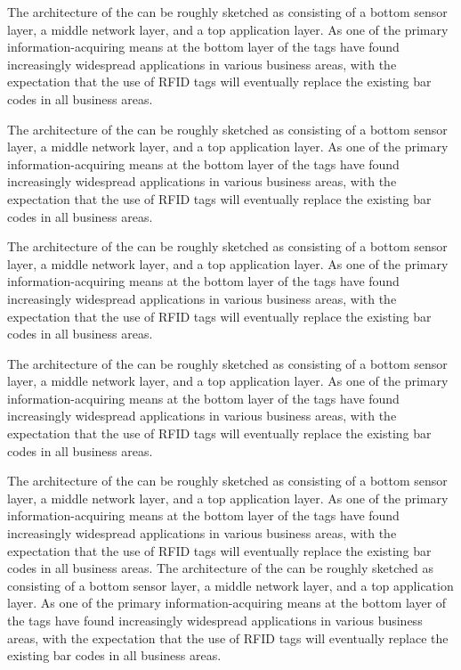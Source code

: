 \documentclass[10pt]{ietbook}
\begin{document}
The architecture of the can be roughly sketched
as consisting of a bottom sensor layer, a middle network layer, and a
top application layer. As one of the primary information-acquiring means
at the bottom layer of the
tags have found increasingly widespread applications in various business
areas, with the expectation that the use of RFID tags will eventually
replace the existing bar codes in all business areas.

The architecture of the can be roughly sketched
as consisting of a bottom sensor layer, a middle network layer, and a
top application layer. As one of the primary information-acquiring means
at the bottom layer of the
tags have found increasingly widespread applications in various business
areas, with the expectation that the use of RFID tags will eventually
replace the existing bar codes in all business areas.

The architecture of the can be roughly sketched
as consisting of a bottom sensor layer, a middle network layer, and a
top application layer. As one of the primary information-acquiring means
at the bottom layer of the
tags have found increasingly widespread applications in various business
areas, with the expectation that the use of RFID tags will eventually
replace the existing bar codes in all business areas.

The architecture of the can be roughly sketched
as consisting of a bottom sensor layer, a middle network layer, and a
top application layer. As one of the primary information-acquiring means
at the bottom layer of the
tags have found increasingly widespread applications in various business
areas, with the expectation that the use of RFID tags will eventually
replace the existing bar codes in all business areas.

The architecture of the can be roughly sketched
as consisting of a bottom sensor layer, a middle network layer, and a
top application layer. As one of the primary information-acquiring means
at the bottom layer of the
tags have found increasingly widespread applications in various business
areas, with the expectation that the use of RFID tags will eventually
replace the existing bar codes in all business areas.
The architecture of the can be roughly sketched
as consisting of a bottom sensor layer, a middle network layer, and a
top application layer. As one of the primary information-acquiring means
at the bottom layer of the
tags have found increasingly widespread applications in various business
areas, with the expectation that the use of RFID tags will eventually
replace the existing bar codes in all business areas.
\end{document}

